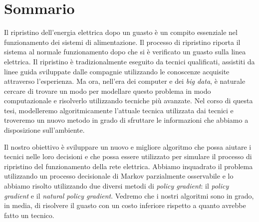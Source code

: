 \chapter*{Sommario} %

\setcounter{page}{1}


Il ripristino dell'energia elettrica dopo un guasto è un compito essenziale nel funzionamento dei sistemi di alimentazione. Il processo di ripristino riporta il sistema al normale funzionamento dopo che si è verificato un guasto sulla linea elettrica. Il ripristino è tradizionalmente eseguito da tecnici qualificati, assistiti da linee guida sviluppate dalle compagnie utilizzando le conoscenze acquisite attraverso l'esperienza. Ma ora, nell'era dei computer e dei \textit{big data}, è naturale cercare di trovare un modo per modellare questo problema in modo computazionale e risolverlo utilizzando tecniche più avanzate. Nel corso di questa tesi, modelleremo algoritmicamente l'attuale tecnica utilizzata dai tecnici e troveremo un nuovo metodo in grado di sfruttare le informazioni che abbiamo a disposizione sull'ambiente.

Il nostro obiettivo è sviluppare un nuovo e migliore algoritmo che possa aiutare i tecnici nelle loro decisioni e che possa essere utilizzato per simulare il processo di ripristino del funzionamento della rete elettrica. Abbiamo inquadrato il problema utilizzando un processo decisionale di Markov parzialmente osservabile e lo abbiamo risolto utilizzando due diversi metodi di \textit{policy gradient}: il \textit{policy gradient} e il \textit{natural policy gradient}. Vedremo che i nostri algoritmi sono in grado, in media, di risolvere il guasto con un costo inferiore rispetto a quanto avrebbe fatto un tecnico.